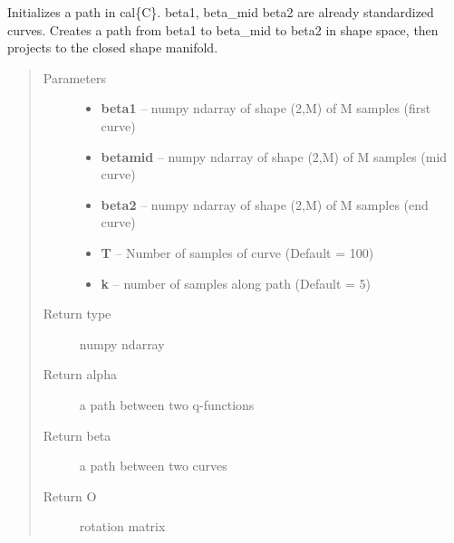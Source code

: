\documentclass[letterpaper,10pt,english]{sphinxmanual}
\begin{document}
\begin{fulllineitems}
\label{geodesic:geodesic.init_path_rand}
Initializes a path in cal\{C\}. beta1, beta\_mid beta2 are already
standardized curves. Creates a path from beta1 to beta\_mid to beta2 in
shape space, then projects to the closed shape manifold.
\begin{quote}\begin{description}
\item[{Parameters}] \leavevmode\begin{itemize}
\item {} 
\textbf{beta1} -- numpy ndarray of shape (2,M) of M samples (first curve)

\item {} 
\textbf{betamid} -- numpy ndarray of shape (2,M) of M samples (mid curve)

\item {} 
\textbf{beta2} -- numpy ndarray of shape (2,M) of M samples (end curve)

\item {} 
\textbf{T} -- Number of samples of curve (Default = 100)

\item {} 
\textbf{k} -- number of samples along path (Default = 5)

\end{itemize}

\item[{Return type}] \leavevmode
numpy ndarray

\item[{Return alpha}] \leavevmode
a path between two q-functions

\item[{Return beta}] \leavevmode
a path between two curves

\item[{Return O}] \leavevmode
rotation matrix

\end{description}\end{quote}

\end{fulllineitems}

\end{document}
